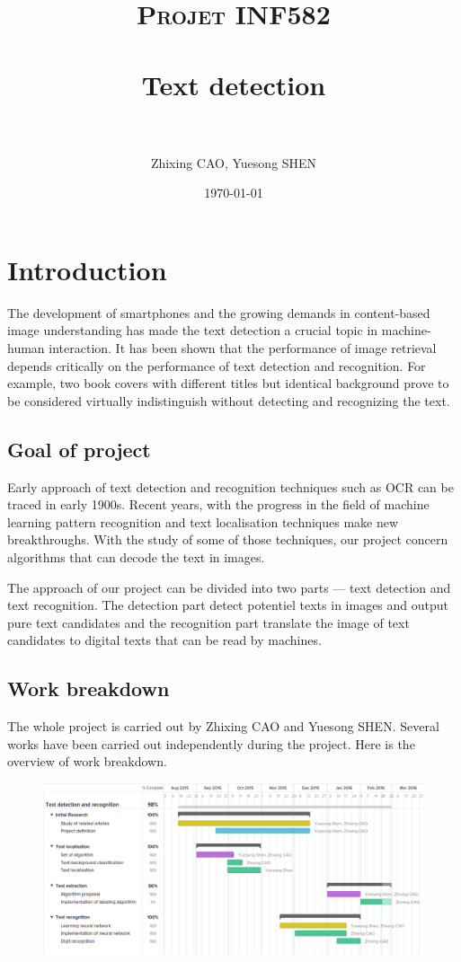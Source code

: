 \documentclass[paper=a4, french, 11pt]{scrartcl}
\title{	
\normalfont \normalsize 
\textsc{Projet INF582} \\ [25pt] 
\horrule{0.5pt} \\[0.5cm] %
\huge Text detection \\ %
\horrule{2pt} \\[0.5cm] %
}
\author{Zhixing CAO, Yuesong SHEN} %
\date{\normalsize\today} %
\begin{document}
\setlength\parindent{12pt}
\maketitle %

\section{Introduction}
The development of smartphones and the growing demands in content-based image understanding has made the text detection a crucial topic in machine-human interaction. It has been shown that the performance of image retrieval depends critically on the performance of text detection and recognition. For example, two book covers with different titles but identical background prove to be considered virtually indistinguish without detecting and recognizing the text.

\subsection{Goal of project}
Early approach of text detection and recognition techniques such as OCR can be traced in early 1900s. Recent years, with the progress in the field of machine learning pattern recognition and text localisation techniques make new breakthroughs. With the study of some of those techniques, our project concern algorithms that can decode the text in images.

The approach of our project can be divided into two parts --- text detection and text recognition. The detection part detect potentiel texts in images and output pure text candidates and the recognition part translate the image of text candidates to digital texts that can be read by machines.

\subsection{Work breakdown}
The whole project is carried out by Zhixing CAO and Yuesong SHEN. Several works have been carried out independently during the project. Here is the overview of work breakdown.\
\begin{figure}
	\includegraphics[width=0.7\paperwidth]{breakdowns.png}
\end{figure}
 
\end{document}
